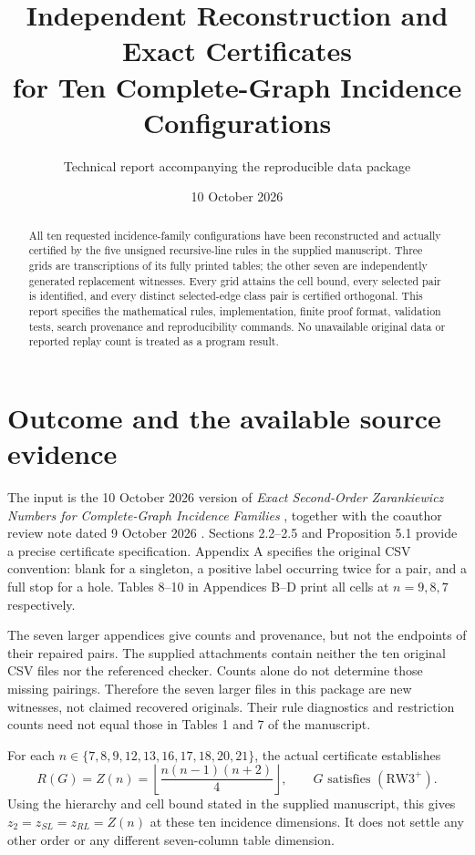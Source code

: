 \documentclass[11pt]{article}
\title{Independent Reconstruction and Exact Certificates\\for Ten Complete-Graph Incidence Configurations}
\author{Technical report accompanying the reproducible data package}
\date{10 October 2026}
\newcommand{\RW}{\mathrm{RW3}^{+}}
\begin{document}
\maketitle
\begin{abstract}
All ten requested incidence-family configurations have been reconstructed and
actually certified by the five unsigned recursive-line rules in the supplied
manuscript. Three grids are transcriptions of its fully printed tables; the
other seven are independently generated replacement witnesses. Every grid
attains the cell bound, every selected pair is identified, and every distinct
selected-edge class pair is certified orthogonal. This report specifies the
mathematical rules, implementation, finite proof format, validation tests,
search provenance and reproducibility commands. No unavailable original data
or reported replay count is treated as a program result.
\end{abstract}

\section{Outcome and the available source evidence}
The input is the 10 October 2026 version of \emph{Exact Second-Order Zarankiewicz
Numbers for Complete-Graph Incidence Families} \cite{manuscript}, together with
the coauthor review note dated 9 October 2026 \cite{note}. Sections 2.2--2.5 and
Proposition 5.1 provide a precise certificate specification. Appendix A
specifies the original CSV convention: blank for a singleton, a positive label
occurring twice for a pair, and a full stop for a hole. Tables 8--10 in
Appendices B--D print all cells at $n=9,8,7$ respectively.

The seven larger appendices give counts and provenance, but not the endpoints
of their repaired pairs. The supplied attachments contain neither the ten
original CSV files nor the referenced checker. Counts alone do not determine
those missing pairings. Therefore the seven larger files in this package are
new witnesses, not claimed recovered originals. Their rule diagnostics and
restriction counts need not equal those in Tables 1 and 7 of the manuscript.

For each $n\in\{7,8,9,12,13,16,17,18,20,21\}$, the actual certificate establishes
\[
 R(G)=Z(n)=\left\lfloor\frac{n(n-1)(n+2)}4\right\rfloor,
 \qquad G\text{ satisfies }(\RW).
\]
Using the hierarchy and cell bound stated in the supplied manuscript, this
gives $z_2=z_{SL}=z_{RL}=Z(n)$ at these ten incidence dimensions. It does not
settle any other order or any different seven-column table dimension.
\end{document}
